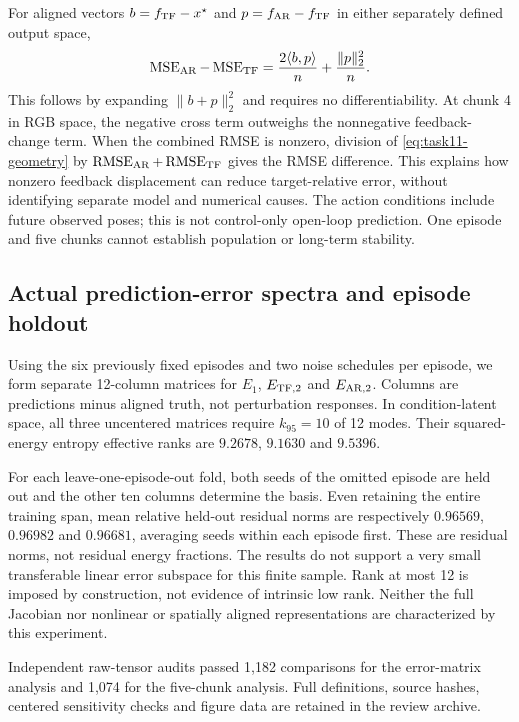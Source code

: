 For aligned vectors $b=f_{\rm TF}-x^\star$ and
$p=f_{\rm AR}-f_{\rm TF}$ in either separately defined output space,
\begin{equation}
 \operatorname{MSE}_{\rm AR}-\operatorname{MSE}_{\rm TF}
 =\frac{2\langle b,p\rangle}{n}+\frac{\|p\|_2^2}{n}.
 \label{eq:task11-geometry}
\end{equation}
This follows by expanding $\|b+p\|_2^2$ and requires no differentiability.
At chunk 4 in RGB space, the negative cross term outweighs the nonnegative
feedback-change term. When the combined RMSE is nonzero, division of
\eqref{eq:task11-geometry} by
$\operatorname{RMSE}_{\rm AR}+\operatorname{RMSE}_{\rm TF}$ gives
the RMSE difference. This explains how nonzero feedback displacement can
reduce target-relative error, without identifying separate model and numerical
causes. The action conditions include future observed poses; this is not
control-only open-loop prediction. One episode and five chunks cannot establish
population or long-term stability.

\subsection{Actual prediction-error spectra and episode holdout}
Using the six previously fixed episodes and two noise schedules per episode,
we form separate 12-column matrices for $E_1$, $E_{{\rm TF},2}$ and
$E_{{\rm AR},2}$. Columns are predictions minus aligned truth, not perturbation
responses. In condition-latent space, all three uncentered matrices require
$k_{95}=10$ of 12 modes. Their squared-energy entropy effective ranks are
$9.2678$, $9.1630$ and $9.5396$.

For each leave-one-episode-out fold, both seeds of the omitted episode are
held out and the other ten columns determine the basis. Even retaining the
entire training span, mean relative held-out residual norms are respectively
$0.96569$, $0.96982$ and $0.96681$, averaging seeds within each episode first.
These are residual norms, not residual energy fractions. The results do not
support a very small transferable linear error subspace for this finite sample.
Rank at most 12 is imposed by construction, not evidence of intrinsic low rank.
Neither the full Jacobian nor nonlinear or spatially aligned representations
are characterized by this experiment.

Independent raw-tensor audits passed 1,182 comparisons for the error-matrix
analysis and 1,074 for the five-chunk analysis. Full definitions, source hashes,
centered sensitivity checks and figure data are retained in the review archive.
